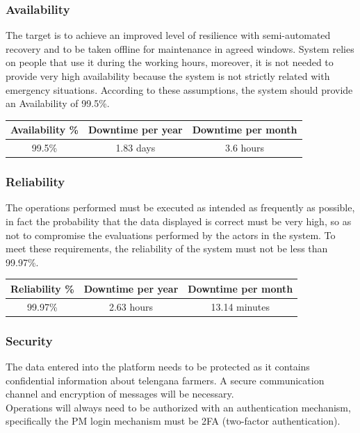 \documentclass[10pt]{article}
\begin{document}
\subsubsection{Availability}
The target is to achieve an improved level of resilience with semi-automated recovery and to be taken offline for maintenance in agreed windows.
System relies on people that use it during the working hours, moreover, it is not needed to provide very high availability because the system is not strictly related with emergency situations.
According to these assumptions, the system should provide an Availability of 99.5\%.
\begin{center}
    \begin{tabular}{|c c c|} 
    \hline
    Availability \% & Downtime per year & Downtime per month\\ 
    \hline
    99.5\%  & 1.83 days & 3.6 hours\\ 
    \hline
    \end{tabular}
\end{center}
\subsubsection{Reliability}
The operations performed must be executed as intended as frequently as possible, in fact the probability that the data displayed is correct must be 
very high, so as not to compromise the evaluations performed by the actors in the system. To meet these requirements, the reliability of the system must 
not be less than 99.97\%.
\begin{center}
    \begin{tabular}{|c c c|} 
    \hline
    Reliability \% & Downtime per year & Downtime per month\\ 
    \hline
    99.97\%  & 2.63 hours & 13.14 minutes\\ 
    \hline
    \end{tabular}
\end{center}
\subsubsection{Security}
The data entered into the platform needs to be protected as it contains confidential information about telengana farmers. A secure communication channel and encryption of messages will be necessary.\\
Operations will always need to be authorized with an authentication mechanism, specifically the PM login mechanism must be 2FA (two-factor authentication).
\end{document}
